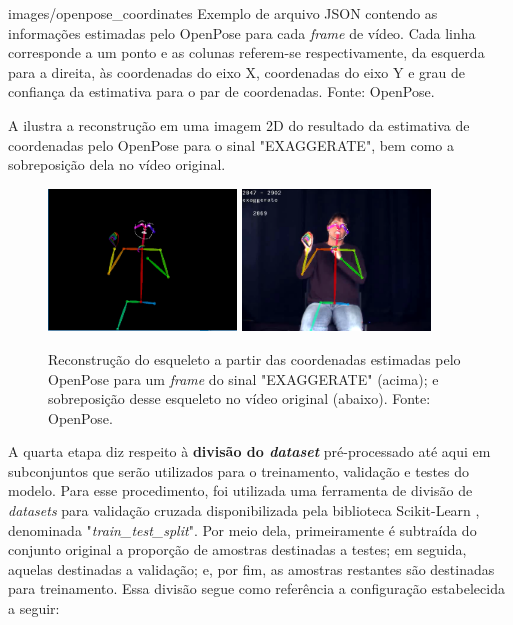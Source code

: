     {images/openpose_coordinates}
    {Exemplo de arquivo JSON contendo as informações estimadas pelo OpenPose para cada \textit{frame} de vídeo. Cada linha corresponde a um ponto e as colunas referem-se respectivamente, da esquerda para a direita, às coordenadas do eixo X, coordenadas do eixo Y e grau de confiança da estimativa para o par de coordenadas. Fonte: OpenPose.}

A  ilustra a reconstrução em uma imagem 2D do resultado da estimativa de coordenadas pelo OpenPose para o sinal "EXAGGERATE", bem como a sobreposição dela no vídeo original.

\begin{figure}[ht]
    \centering
    \includegraphics[width=5cm]{images/sign_pose}
    \includegraphics[width=5cm]{images/sign_pose_blended}
    \caption{Reconstrução do esqueleto a partir das coordenadas estimadas pelo OpenPose para um \textit{frame} do sinal "EXAGGERATE" (acima); e sobreposição desse esqueleto no vídeo original (abaixo). Fonte: OpenPose.}
    \label{fig:sign-pose}
\end{figure}

A quarta etapa diz respeito à \textbf{divisão do \textit{dataset}} pré-processado até aqui em subconjuntos que serão utilizados para o treinamento, validação e testes do modelo. Para esse procedimento, foi utilizada uma ferramenta de divisão de \textit{datasets} para validação cruzada disponibilizada pela biblioteca Scikit-Learn \cite{scikit-learn}, denominada "\textit{train\_test\_split}". Por meio dela, primeiramente é subtraída do conjunto original a proporção de amostras destinadas a testes; em seguida, aquelas destinadas a validação; e, por fim, as amostras restantes são destinadas para treinamento. Essa divisão segue como referência a configuração estabelecida a seguir:

